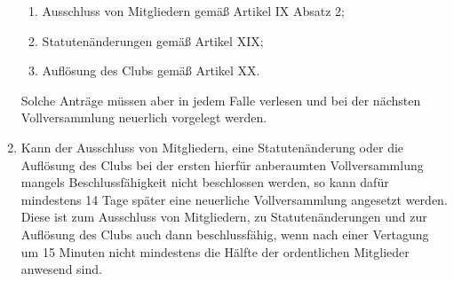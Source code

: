 \documentclass{article}
\begin{document}
\begin{enumerate}
    \begin{enumerate}
        \item Ausschluss von Mitgliedern gemäß Artikel IX Absatz 2;
        \item Statutenänderungen gemäß Artikel XIX;
        \item Auflösung des Clubs gemäß Artikel XX. 
    \end{enumerate}
    Solche Anträge müssen aber in jedem Falle verlesen und bei der nächsten Vollversammlung neuerlich vorgelegt werden.
    \item Kann der Ausschluss von Mitgliedern, eine Statutenänderung oder die Auflösung des Clubs bei der ersten hierfür anberaumten Vollversammlung mangels Beschlussfähigkeit nicht beschlossen werden, so kann dafür mindestens 14 Tage später eine neuerliche Vollversammlung angesetzt werden. Diese ist zum Ausschluss von Mitgliedern, zu Statutenänderungen und zur Auflösung des Clubs auch dann beschlussfähig, wenn nach einer Vertagung um 15 Minuten nicht mindestens die Hälfte der ordentlichen Mitglieder anwesend sind. 
\end{enumerate}
\end{document}
